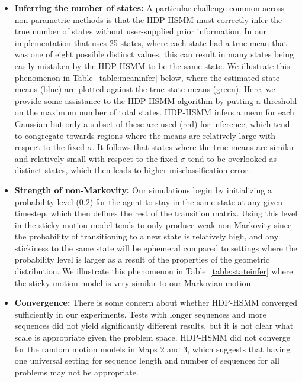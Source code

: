 \documentclass{article}
\begin{document}
\begin{itemize}
  \item \textbf{Inferring the number of states:} A particular challenge common across non-parametric methods is that the HDP-HSMM must correctly infer the true number of states without user-supplied prior information. In our implementation that uses 25 states, where each state had a true mean that was one of eight possible distinct values, this can result in many states being easily mistaken by the HDP-HSMM to be the same state. We illustrate this phenomenon in Table~\ref{table:meaninfer} below, where the estimated state means (blue) are plotted against the true state means (green). Here, we provide some assistance to the HDP-HSMM algorithm by putting a threshold on the maximum number of total states. HDP-HSMM infers a mean for each Gaussian but only a subset of these are used (red) for inference, which tend to congregate towards regions where the means are relatively large with respect to the fixed $\sigma$. It follows that states where the true means are similar and relatively small with respect to the fixed $\sigma$ tend to be overlooked as distinct states, which then leads to higher misclassification error.
  \item \textbf{Strength of non-Markovity:} Our simulations begin by initializing a probability level ($0.2$) for the agent to stay in the same state at any given timestep, which then defines the rest of the transition matrix. Using this level in the sticky motion model tends to only produce weak non-Markovity since the probability of transitioning to a new state is relatively high, and any stickiness to the same state will be ephemeral compared to settings where the probability level is larger as a result of the properties of the geometric distribution. We illustrate this phenomenon in Table~\ref{table:stateinfer} where the sticky motion model is very similar to our Markovian motion.
  \item \textbf{Convergence:} There is some concern about whether HDP-HSMM converged sufficiently in our experiments. Tests with longer sequences and more sequences did not yield significantly different results, but it is not clear what scale is appropriate given the problem space. HDP-HSMM did not converge for the random motion models in Maps 2 and 3, which suggests that having one universal setting for sequence length and number of sequences for all problems may not be appropriate.
\end{itemize}
\end{document}
